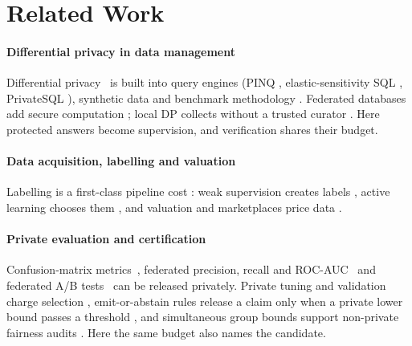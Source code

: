 \section{Related Work}
\label{sec:related}

\paragraph{Differential privacy in data management}
Differential privacy~\cite{dwork2006calibrating,dwork2014algorithmic} is built into query engines
(PINQ \cite{mcsherry2009pinq}, elastic-sensitivity SQL
\cite{johnson2018flex}, PrivateSQL \cite{kotsogiannis2019privatesql}),
synthetic data \cite{zhang2014privbayes} and benchmark methodology
\cite{hay2016dpbench}. Federated databases add secure computation \cite{bater2017smcql,bater2018shrinkwrap};
local DP collects without a trusted curator
\cite{wang2017ldp,wang2019multidim}. Here protected answers become supervision, and verification shares their
budget.

\paragraph{Data acquisition, labelling and valuation}
Labelling is a first-class pipeline cost
\cite{roh2021survey,whang2023datacentric}: weak supervision creates labels
\cite{ratner2017snorkel}, active learning chooses them
\cite{settles2009active}, and valuation and marketplaces price data
\cite{ghorbani2019shapley,jia2019shapley,agarwal2019marketplace}.

\paragraph{Private evaluation and certification}
Confusion-matrix metrics~\cite{boyd2015classifier}, federated precision,
recall and ROC-AUC~\cite{cormode2022federated,wang2019federated} and
federated A/B tests~\cite{chen2024federated} can be released privately. Private tuning and validation charge selection
\cite{chaudhuri2013stability,liu2019private,papernot2022hyperparameter,mohapatra2022honest},
emit-or-abstain rules release a claim only when a private lower bound passes
a threshold \cite{takahashi2026evidence,takahashi2026privcert}, and simultaneous group bounds
support non-private fairness audits \cite{cherian2023fairness}. Here the same budget also names the candidate.

